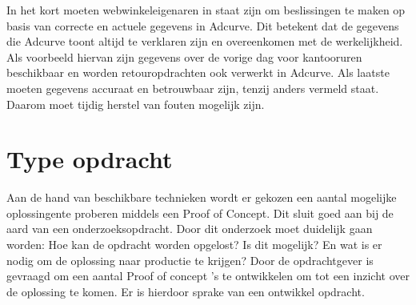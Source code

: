 In het kort moeten webwinkeleigenaren in staat zijn om beslissingen te maken op basis van correcte en actuele gegevens in Adcurve. Dit betekent dat de gegevens die Adcurve toont altijd te verklaren zijn en overeenkomen met de werkelijkheid. Als voorbeeld hiervan zijn gegevens over de vorige dag voor kantooruren beschikbaar en worden retouropdrachten ook verwerkt in Adcurve. Als laatste moeten gegevens accuraat en betrouwbaar zijn, tenzij anders vermeld staat. Daarom moet tijdig herstel van fouten mogelijk zijn.

\section{Type opdracht}

Aan de hand van beschikbare technieken wordt er gekozen een aantal mogelijke oplossingen\newline te proberen middels een Proof of Concept. Dit sluit goed aan bij de aard van een onderzoeksopdracht. Door dit onderzoek moet duidelijk gaan worden: Hoe kan de opdracht worden opgelost? Is dit mogelijk? En wat is er nodig om de oplossing naar productie te krijgen? Door de opdrachtgever is gevraagd om een aantal Proof of concept
's te ontwikkelen om tot een inzicht over de oplossing te komen. Er is hierdoor sprake van een ontwikkel opdracht.

